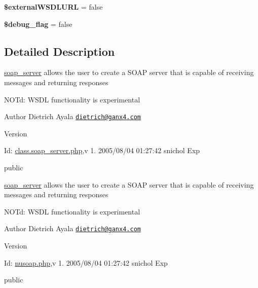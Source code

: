 \begin{DoxyCompactItemize}
\item 
\hypertarget{classsoap__server_ab5b3efddc8a73e3895444f85674950d1}{{\bfseries \$external\-W\-S\-D\-L\-U\-R\-L} = false}\label{classsoap__server_ab5b3efddc8a73e3895444f85674950d1}

\item 
\hypertarget{classsoap__server_a4365dcf21d6ec72c63e5e6fcbddce4fb}{{\bfseries \$debug\-\_\-flag} = false}\label{classsoap__server_a4365dcf21d6ec72c63e5e6fcbddce4fb}

\end{DoxyCompactItemize}


\subsection{Detailed Description}
\hyperlink{classsoap__server}{soap\-\_\-server} allows the user to create a S\-O\-A\-P server that is capable of receiving messages and returning responses

N\-O\-Td\-: W\-S\-D\-L functionality is experimental

\begin{DoxyAuthor}{Author}
Dietrich Ayala \href{mailto:dietrich@ganx4.com}{\tt dietrich@ganx4.\-com} 
\end{DoxyAuthor}
\begin{DoxyVersion}{Version}

\end{DoxyVersion}
\begin{DoxyParagraph}{Id\-:}
\hyperlink{class_8soap__server_8php_source}{class.\-soap\-\_\-server.\-php},v 1. 2005/08/04 01\-:27\-:42 snichol Exp 
\end{DoxyParagraph}
public

\hyperlink{classsoap__server}{soap\-\_\-server} allows the user to create a S\-O\-A\-P server that is capable of receiving messages and returning responses

N\-O\-Td\-: W\-S\-D\-L functionality is experimental

\begin{DoxyAuthor}{Author}
Dietrich Ayala \href{mailto:dietrich@ganx4.com}{\tt dietrich@ganx4.\-com} 
\end{DoxyAuthor}
\begin{DoxyVersion}{Version}

\end{DoxyVersion}
\begin{DoxyParagraph}{Id\-:}
\hyperlink{nusoap_8php_source}{nusoap.\-php},v 1. 2005/08/04 01\-:27\-:42 snichol Exp 
\end{DoxyParagraph}
public 

